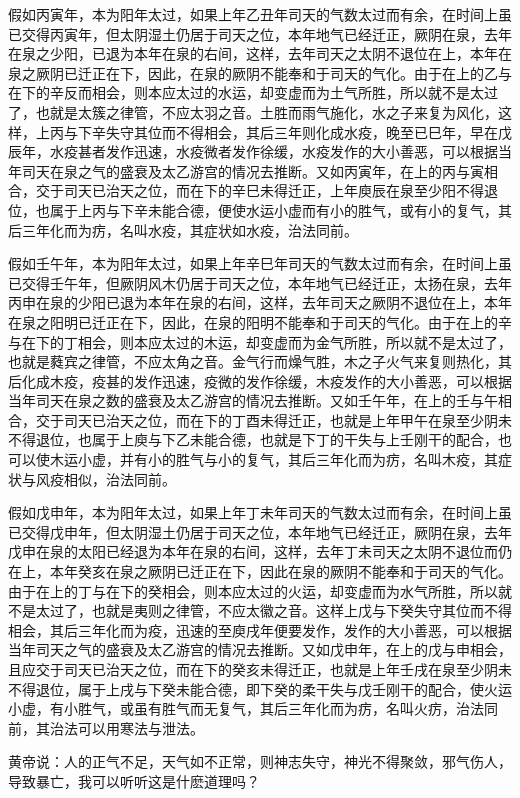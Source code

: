 \documentclass[a4paper,12pt,UTF8,twoside]{ctexbook}
\begin{document}
假如丙寅年，本为阳年太过，如果上年乙丑年司天的气数太过而有余，在时间上虽已交得丙寅年，但太阴湿土仍居于司天之位，本年地气已经迁正，厥阴在泉，去年在泉之少阳，已退为本年在泉的右间，这样，去年司天之太阴不退位在上，本年在泉之厥阴已迁正在下，因此，在泉的厥阴不能奉和于司天的气化。由于在上的乙与在下的辛反而相会，则本应太过的水运，却变虚而为土气所胜，所以就不是太过了，也就是太簇之律管，不应太羽之音。土胜而雨气施化，水之子来复为风化，这样，上丙与下辛失守其位而不得相会，其后三年则化成水疫，晚至已巳年，早在戊辰年，水疫甚者发作迅速，水疫微者发作徐缓，水疫发作的大小善恶，可以根据当年司天在泉之气的盛衰及太乙游宫的情况去推断。又如丙寅年，在上的丙与寅相合，交于司天已治天之位，而在下的辛巳未得迁正，上年庾辰在泉至少阳不得退位，也属于上丙与下辛未能合德，便使水运小虚而有小的胜气，或有小的复气，其后三年化而为疠，名叫水疫，其症状如水疫，治法同前。

假如壬午年，本为阳年太过，如果上年辛巳年司天的气数太过而有余，在时间上虽已交得壬午年，但厥阴风木仍居于司天之位，本年地气已经迁正，太扬在泉，去年丙申在泉的少阳已退为本年在泉的右间，这样，去年司天之厥阴不退位在上，本年在泉之阳明已迁正在下，因此，在泉的阳明不能奉和于司天的气化。由于在上的辛与在下的丁相会，则本应太过的木运，却变虚而为金气所胜，所以就不是太过了，也就是蕤宾之律管，不应太角之音。金气行而燥气胜，木之子火气来复则热化，其后化成木疫，疫甚的发作迅速，疫微的发作徐缓，木疫发作的大小善恶，可以根据当年司天在泉之数的盛衰及太乙游宫的情况去推断。又如壬午年，在上的壬与午相合，交于司天已治天之位，而在下的丁酉未得迁正，也就是上年甲午在泉至少阴未不得退位，也属于上庾与下乙未能合德，也就是下丁的干失与上壬刚干的配合，也可以使木运小虚，并有小的胜气与小的复气，其后三年化而为疠，名叫木疫，其症状与风疫相似，治法同前。

假如戊申年，本为阳年太过，如果上年丁未年司天的气数太过而有余，在时间上虽已交得戊申年，但太阴湿土仍居于司天之位，本年地气已经迁正，厥阴在泉，去年戊申在泉的太阳已经退为本年在泉的右间，这样，去年丁未司天之太阴不退位而仍在上，本年癸亥在泉之厥阴已迁正在下，因此在泉的厥阴不能奉和于司天的气化。由于在上的丁与在下的癸相会，则本应太过的火运，却变虚而为水气所胜，所以就不是太过了，也就是夷则之律管，不应太徽之音。这样上戊与下癸失守其位而不得相会，其后三年化而为疫，迅速的至庾戌年便要发作，发作的大小善恶，可以根据当年司天之气的盛衰及太乙游宫的情况去推断。又如戊申年，在上的戊与申相会，且应交于司天已治天之位，而在下的癸亥未得迁正，也就是上年壬戌在泉至少阴未不得退位，属于上戌与下癸未能合德，即下癸的柔干失与戊壬刚干的配合，使火运小虚，有小胜气，或虽有胜气而无复气，其后三年化而为疠，名叫火疠，治法同前，其治法可以用寒法与泄法。

黄帝说：人的正气不足，天气如不正常，则神志失守，神光不得聚敛，邪气伤人，导致暴亡，我可以听听这是什麽道理吗？
\end{document}
